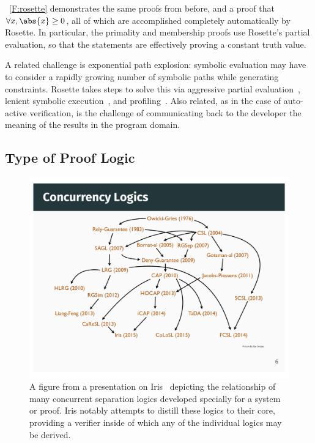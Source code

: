 \figurename~\ref{F:rosette} demonstrates the same proofs from before, and a
proof that \(\forall x, \abs{x} \ge 0\), all of which are accomplished
completely automatically by Rosette. In particular, the primality and membership
proofs use Rosette's partial evaluation, so that the statements are effectively
proving a constant truth value.

A related challenge is exponential path explosion: symbolic evaluation may have
to consider a rapidly growing number of symbolic paths while generating
constraints. Rosette takes steps to solve this via aggressive partial
evaluation~\cite{Torlak_2013,Torlak_2014}, lenient symbolic
execution~\cite{Chang_2018}, and
profiling~\cite{Bornholt_2018,Porncharoenwase_2020}. Also related, as in the
case of auto-active verification, is the challenge of communicating back to the
developer the meaning of the results in the program domain.

\subsection{Type of Proof Logic}\label{S:t_logic}

\begin{figure}[ht]
    \centering
    \includegraphics[width=\textwidth]{img/iris_2_0_concurrent_logics}
    \caption{A figure from a presentation on Iris~\cite{Jung_2016_slides}
    depicting the relationship of many concurrent separation logics developed
    specially for a system or proof. Iris notably attempts to distill these
    logics to their core, providing a verifier inside of which any of the
    individual logics may be derived.}\label{F:iris_complex}
\end{figure}

